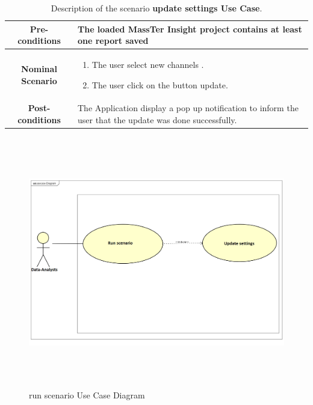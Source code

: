     \begin{table}
    	\caption{Description of the scenario \textbf{update settings Use Case}.}
    	\label{DSTabUS}
  	\centering
  	\begin{tabular}{|c|p{10cm}|}
  	
  		\hline 	
  		\textbf{Pre-conditions } &The loaded MassTer Insight project contains at least one report saved \\ 
  		\hline                     
  		\textbf{Nominal Scenario } & \begin{enumerate}
  			\item The user select new channels .
  			\item The user click on the button update.  
  		\end{enumerate} \\ 
  		\hline 
  		\textbf{Post-conditions} & The Application display a pop up notification to inform the user that the update was done successfully. \\
  		\hline 
  	\end{tabular}
  \end{table}

	 	\begin{figure}[h]
	 	\centering
	 	\includegraphics[width=16.5cm,height=11cm]{runScenario.png}
	 	\caption{run scenario Use Case Diagram}
	 	
	 \end{figure}
	

